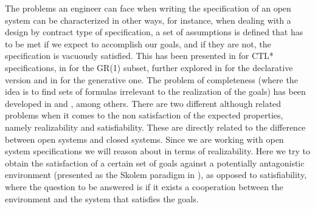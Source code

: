 The problems an engineer can face when writing the specification
of an open system can be characterized in other ways, for instance, 
when dealing with a design by contract type of specification, a set of assumptions is defined that has to be met
if we expect to accomplish our goals, and
if they are not, the specification is vacuously satisfied.
This has been presented in \cite{kupferman2003vacuity}
for CTL* specifications, in \cite{DBLP:conf/hvc/KleinP10} for the
GR(1)\cite{DBLP:conf/vmcai/PitermanPS06} subset, further explored in \cite{DBLP:conf/sigsoft/MaozR16}
for the declarative version and in \cite{DBLP:phd/ethos/DIppolito13}
for the generative one.  
The problem of completeness (where the idea is to find sets of formulas
irrelevant to the realization of the goals) has been
developed in \cite{chockler2001practical} and \cite{chockler2001coverage},
among others.
There are two different although related problems when it comes to 
the non satisfaction of the expected properties, namely
 realizability and satisfiability.
 These are directly related to the difference
between open systems and closed systems.  
Since 
we are working with open system specifications we will reason about in terms of
realizability.  Here we try to obtain the 
satisfaction of a certain set of goals against a
potentially antagonistic environment (presented as the Skolem paradigm in 
\cite{DBLP:conf/popl/PnueliR89}), as opposed to satisfiability, where
the question to be answered is if it exists a cooperation between 
the environment and the system that satisfies the goals.


